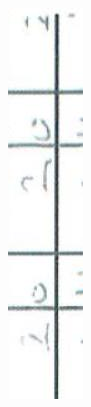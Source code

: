 \documentclass[10pt]{article}
\begin{document}
\includegraphics[max width=\textwidth, center]{2025_02_27_dd68c3d38de88f0516d9g-019(8)}\\
\end{document}
